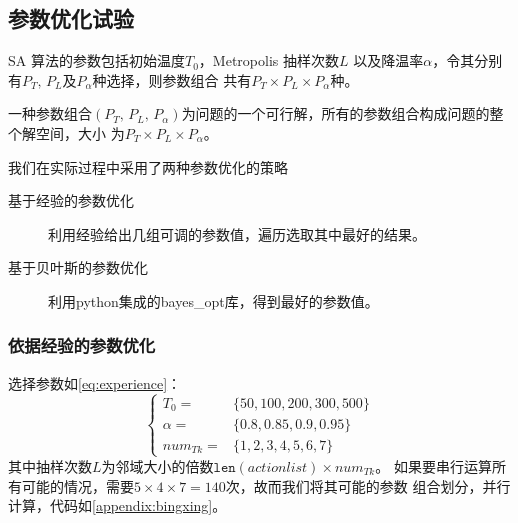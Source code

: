 \documentclass{nudt}
\begin{document}
\subsection{参数优化试验}
SA 算法的参数包括初始温度$T_0$，Metropolis 抽样次数$L$
以及降温率$\alpha$，令其分别有$P_T,\, P_L$及$P_{\alpha}$种选择，则参数组合
共有$P_T\times P_L\times P_{\alpha}$种。

一种参数组合$(P_T,\, P_L,\, P_{\alpha})$为问题的一个可行解，所有的参数组合构成问题的整个解空间，大小
为$P_T\times P_L\times P_{\alpha}$。

我们在实际过程中采用了两种参数优化的策略
\begin{description}
	\item[基于经验的参数优化] 利用经验给出几组可调的参数值，遍历选取其中最好的结果。
	\item[基于贝叶斯的参数优化] 利用python集成的bayes\_opt库，得到最好的参数值。
\end{description}

\subsubsection{依据经验的参数优化}\label{subsubsec:exp}
选择参数如\cref{eq:experience}：
\begin{equation}\label{eq:experience}
\left\{
	\begin{array}{cl}
	T_0 =& \{50, 100, 200, 300, 500\} \\
	\alpha =& \{0.8, 0.85 ,0.9, 0.95\} \\
	num_{Tk} =& \{1, 2, 3, 4, 5 ,6, 7\} 	
	\end{array}
\right.
\end{equation}
其中抽样次数$L$为邻域大小的倍数$\mathtt{len}(actionlist) \times num_{Tk}$。
如果要串行运算所有可能的情况，需要$5\times 4\times 7 = 140$次，故而我们将其可能的参数
组合划分，并行计算，代码如\ref{appendix:bingxing}。
\end{document}
